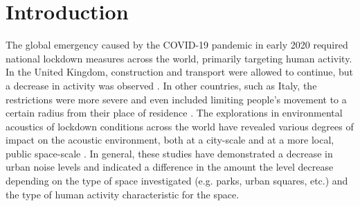 
\section{Introduction}
\label{sec:intro}
The global emergency caused by the COVID-19 pandemic in early 2020 required national lockdown measures across the world, primarily targeting human activity. In the United Kingdom, construction and transport were allowed to continue, but a decrease in activity was observed \citep{hadjidemetriou_impact_2020}. In other countries, such as Italy, the restrictions were more severe and even included limiting people's movement to a certain radius from their place of residence \citep{ren_pandemic_2020}. The explorations in environmental acoustics of lockdown conditions across the world have revealed various degrees of impact on the acoustic environment, both at a city-scale \citep{asensio_madrid_2020, bonet-sola_soundscape_2021, munoz_lockdown_2020, rumpler_noise_2021, hornberg_covid_2021} and at a more local, public space-scale \citep{aletta_assessing_2020, alsina-pages_changes_2021, bonet-sola_soundscape_2021, manzano_sound_2021}. In general, these studies have demonstrated a decrease in urban noise levels and indicated a difference in the amount the level decrease depending on the type of space investigated (e.g. parks, urban squares, etc.) and the type of human activity characteristic for the space.


